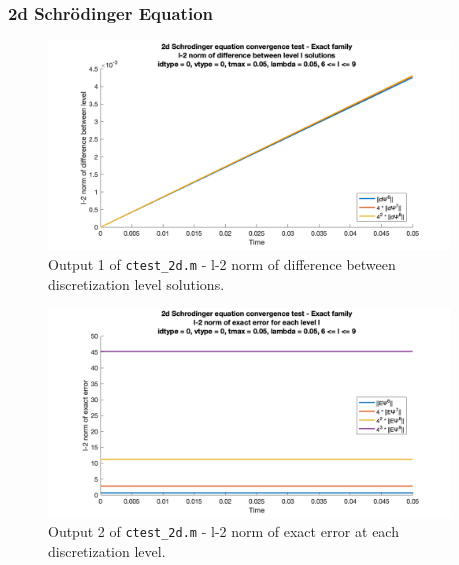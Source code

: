 \documentclass[10pt]{article}
\def\code#1{\texttt{#1}} %
\begin{document}
\subsubsection*{2d Schrödinger Equation}


\begin{figure}[H]
\centering
\includegraphics[width=0.95\textwidth]{problem2/ctest_2d-1.png}
\caption{Output 1 of \code{ctest\_2d.m} - 
l-2 norm of difference between discretization level solutions.}
\end{figure}

\begin{figure}[H]
\centering
\includegraphics[width=0.95\textwidth]{problem2/ctest_2d-2.png}
\caption{Output 2 of \code{ctest\_2d.m} - 
l-2 norm of exact error at each discretization level.}
\end{figure}

\end{document}
